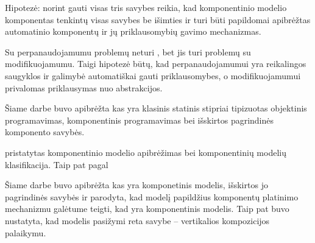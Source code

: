 Hipotezė: norint gauti visas tris savybes reikia, kad komponentinio
modelio komponentas tenkintų visas savybes be išimties ir
turi būti papildomai apibrėžtas automatinio komponentų ir jų
priklausomybių gavimo mechanizmas.


Su perpanaudojamumu problemų neturi , bet jis
turi problemų su modifikuojamumu. Taigi hipotezė būtų, kad
perpanaudojamumui yra reikalingos saugyklos ir galimybė automatiškai
gauti priklausomybes, o modifikuojamumui privalomas priklausymas
nuo abstrakcijos.


Šiame darbe buvo apibrėžta kas yra klasinis statinis stipriai
tipizuotas objektinis programavimas, komponentinis programavimas
bei išskirtos pagrindinės komponento savybės. 

pristatytas komponentinio modelio apibrėžimas
bei komponentinių modelių klasifikacija. Taip pat pagal

Šiame darbe buvo apibrėžta kas yra komponetinis modelis, išskirtos
jo pagrindinės savybės ir parodyta, kad  modelį
papildžius komponentų platinimo mechanizmu galėtume teigti, kad
 yra komponentinis modelis. Taip pat buvo nustatyta,
kad  modelis pasižymi reta savybe – vertikalios
kompozicijos palaikymu.
